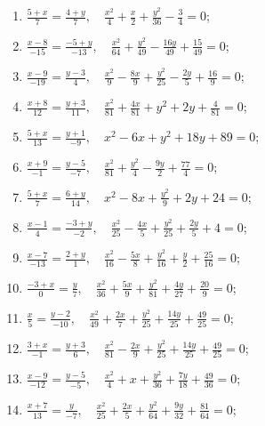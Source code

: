 	\vspace{10pt}

	\begin{enumerate}
		\setcounter{enumi}{\value{tasks}}

			\item \( \displaystyle \frac{5+x}{7} = \frac{4+y}{7}, \quad \frac{x^2}{4} + \frac{x}{2} + \frac{y^2}{36} - \frac{3}{4} = 0 \);
			\item \( \displaystyle \frac{x-8}{-15} = \frac{-5+y}{-13}, \quad \frac{x^2}{64} + \frac{y^2}{49} - \frac{16 y}{49} + \frac{15}{49} = 0 \);
			\item \( \displaystyle \frac{x-9}{-19} = \frac{y-3}{4}, \quad \frac{x^2}{9} - \frac{8 x}{9} + \frac{y^2}{25} - \frac{2 y}{5} + \frac{16}{9} = 0 \);
			\item \( \displaystyle \frac{x+8}{12} = \frac{y+3}{11}, \quad \frac{x^2}{81} + \frac{4 x}{81} + y^2 + 2 y + \frac{4}{81} = 0 \);
			\item \( \displaystyle \frac{5+x}{13} = \frac{y+1}{-9}, \quad x^2 - 6 x + y^2 + 18 y + 89 = 0 \);
			\item \( \displaystyle \frac{x+9}{-1} = \frac{y-5}{-7}, \quad \frac{x^2}{81} + \frac{y^2}{4} - \frac{9 y}{2} + \frac{77}{4} = 0 \);
			\item \( \displaystyle \frac{5+x}{7} = \frac{6+y}{14}, \quad x^2 - 8 x + \frac{y^2}{9} + 2 y + 24 = 0 \);
			\item \( \displaystyle \frac{x-1}{4} = \frac{-3+y}{-2}, \quad \frac{x^2}{25} - \frac{4 x}{5} + \frac{y^2}{25} + \frac{2 y}{5} + 4 = 0 \);
			\item \( \displaystyle \frac{x-7}{-13} = \frac{2+y}{1}, \quad \frac{x^2}{16} - \frac{5 x}{8} + \frac{y^2}{16} + \frac{y}{2} + \frac{25}{16} = 0 \);
			\item \( \displaystyle \frac{-3+x}{0} = \frac{y}{7}, \quad \frac{x^2}{36} + \frac{5 x}{9} + \frac{y^2}{81} + \frac{4 y}{27} + \frac{20}{9} = 0 \);
			\item \( \displaystyle \frac{x}{5} = \frac{y-2}{-10}, \quad \frac{x^2}{49} + \frac{2 x}{7} + \frac{y^2}{25} + \frac{14 y}{25} + \frac{49}{25} = 0 \);
			\item \( \displaystyle \frac{3+x}{-1} = \frac{y+3}{6}, \quad \frac{x^2}{81} - \frac{2 x}{9} + \frac{y^2}{25} + \frac{14 y}{25} + \frac{49}{25} = 0 \);
			\item \( \displaystyle \frac{x-9}{-12} = \frac{y-5}{-5}, \quad \frac{x^2}{4} + x + \frac{y^2}{36} + \frac{7 y}{18} + \frac{49}{36} = 0 \);
			\item \( \displaystyle \frac{x+7}{13} = \frac{y}{-7}, \quad \frac{x^2}{25} + \frac{2 x}{5} + \frac{y^2}{64} + \frac{9 y}{32} + \frac{81}{64} = 0 \);

\end{enumerate}

